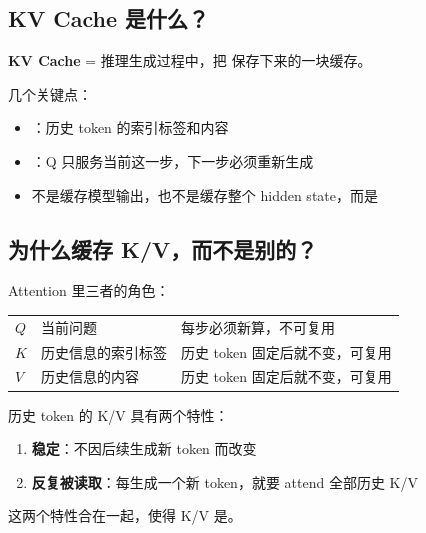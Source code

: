 \subsection{KV Cache 是什么？}

\begin{summarybox}
\textbf{KV Cache} = 推理生成过程中，把 保存下来的一块缓存。
\end{summarybox}

几个关键点：

\begin{itemize}[leftmargin=1.5em]
  \item {}：历史 token 的索引标签和内容
  \item {}：Q 只服务当前这一步，下一步必须重新生成
  \item 不是缓存模型输出，也不是缓存整个 hidden state，而是
\end{itemize}

\subsection{为什么缓存 K/V，而不是别的？}

Attention 里三者的角色：

\begin{center}
{\small
\begin{tabular}{p{1.5cm}p{3cm}p{8cm}}
\hline
$Q$ & 当前问题 & 每步必须新算，不可复用 \\
$K$ & 历史信息的索引标签 & 历史 token 固定后就不变，可复用 \\
$V$ & 历史信息的内容 & 历史 token 固定后就不变，可复用 \\
\hline
\end{tabular}
}
\end{center}

历史 token 的 K/V 具有两个特性：
\begin{enumerate}[leftmargin=1.5em]
  \item \textbf{稳定}：不因后续生成新 token 而改变
  \item \textbf{反复被读取}：每生成一个新 token，就要 attend 全部历史 K/V
\end{enumerate}

这两个特性合在一起，使得 K/V 是。

